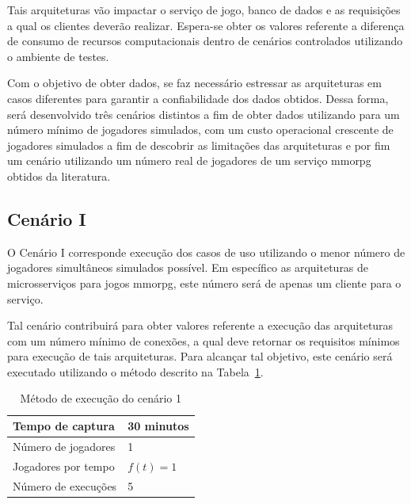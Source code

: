 Tais arquiteturas vão impactar o serviço de jogo, banco de dados e as requisições a qual os clientes deverão realizar.
%
Espera-se obter os valores referente a diferença de consumo de recursos computacionais dentro de cenários controlados utilizando o ambiente de testes.



Com o objetivo de obter dados, se faz necessário estressar as arquiteturas em casos diferentes para garantir a confiabilidade dos dados obtidos.
%
Dessa forma, será desenvolvido três cenários distintos a fim de obter dados utilizando para um número mínimo de jogadores simulados, com um custo operacional crescente de jogadores simulados a fim de descobrir as limitações das arquiteturas e por fim um cenário utilizando um número real de jogadores de um serviço \ac{mmorpg} obtidos da literatura.



\subsection{Cenário I}



O Cenário I corresponde execução dos casos de uso utilizando o menor número de jogadores simultâneos simulados possível.
%
Em específico as arquiteturas de microsserviços para jogos \ac{mmorpg}, este número será de apenas um cliente para o serviço.



Tal cenário contribuirá para obter valores referente a execução das arquiteturas com um número mínimo de conexões, a qual deve retornar os requisitos mínimos para execução de tais arquiteturas.
%
Para alcançar tal objetivo, este cenário será executado utilizando o método descrito na Tabela~\ref{tab:cenario_1}.

\begin{table}[htb!]
\centering
\caption{Método de execução do cenário 1}
\label{tab:cenario_1}
\begin{tabular}{|l|l|}
\hline
Tempo de captura    & 30 minutos \\ \hline
Número de jogadores & 1          \\ \hline
Jogadores por tempo & $f(t) = 1$ \\ \hline
Número de execuções & 5          \\ \hline
\end{tabular}
\end{table}



